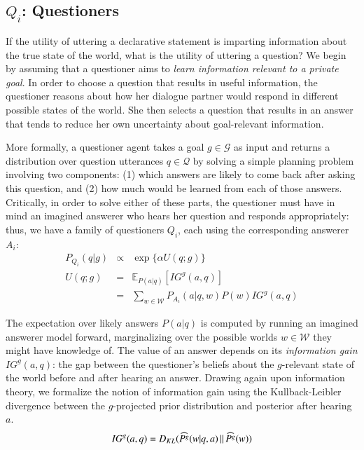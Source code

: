 \documentclass[12pt, floatsintext, jou]{apa6}
\newcommand{\KL}[2]{\ensuremath{D_{KL}({#1}\, \| \, {#2})}}
\newcommand{\E}[2]{\ensuremath{\mathbb{E}_{#1}\left [#2 \right]}}
\begin{document}
\subsection{$Q_i$: Questioners}

If the utility of uttering a declarative statement is imparting information about the true state of the world, what is the utility of uttering a question? We begin by assuming that a questioner aims to \emph{learn information relevant to a private goal}.
%
In order to choose a question that results in useful information, the questioner reasons about how her dialogue partner would respond in different possible states of the world. She then selects a question that results in an answer that tends to reduce her own uncertainty about goal-relevant information.
%


More formally, a questioner agent takes a goal $g \in \mathcal{G}$ as input and returns a distribution over question utterances $q \in \mathcal{Q}$ by solving a simple planning problem involving two components: (1) which answers are likely to come back after asking this question, and (2) how much would be learned from each of those answers. Critically, in order to solve either of these parts, the questioner must have in mind an imagined answerer who hears her question and responds appropriately: thus, we have a family of questioners $Q_i$, each using the corresponding answerer $A_i$:
%
$$
\begin{array}{lcl}
P_{Q_i}(q|g)  & \propto & \exp\{\alpha U(q;g)\} \\
U(q;g) & = & \E{P(a|q)}{IG^g(a,q)} \\
	 & = & \sum_{w\in\mathcal{W}} P_{A_i}(a|q,w)P(w) IG^g(a,q)
\end{array}
$$
%

The expectation over likely answers $P(a|q)$ is computed by running an imagined answerer model forward, marginalizing over the possible worlds $w \in\mathcal{W}$ they might have knowledge of. The value of an answer depends on its \emph{information gain} $IG^g(a,q)$: the gap between the questioner's beliefs about the $g$-relevant state of the world before and after hearing an answer. Drawing again upon information theory, we formalize the notion of information gain using the Kullback-Leibler divergence between the $g$-projected prior distribution and posterior after hearing $a$.
%
$$
IG^g(a,q) = \KL{\widehat{P^g}(w|q, a)}{\widehat{P^g}(w)}\\
$$
%
\end{document}
